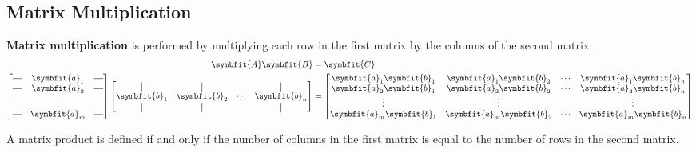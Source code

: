 \documentclass{article}
\begin{document}
\subsection{Matrix Multiplication}
\begin{definition}
    \textbf{Matrix multiplication} is performed by multiplying each row
    in the first matrix by the columns of the second matrix.
    \begin{align*}
        \symbfit{A} \symbfit{B} & = \symbfit{C} \\
        \begin{bmatrix}
            \horzbar & \symbfit{a}_{1} & \horzbar \\
            \horzbar & \symbfit{a}_{2} & \horzbar \\
                     & \vdots          &          \\
            \horzbar & \symbfit{a}_{m} & \horzbar
        \end{bmatrix}
        \begin{bmatrix}
            \vertbar        & \vertbar        &        & \vertbar        \\
            \symbfit{b}_{1} & \symbfit{b}_{2} & \cdots & \symbfit{b}_{n} \\
            \vertbar        & \vertbar        &        & \vertbar
        \end{bmatrix}
                                & =
        \begin{bmatrix}
            \symbfit{a}_1\symbfit{b}_1 & \symbfit{a}_1\symbfit{b}_2 & \cdots & \symbfit{a}_1\symbfit{b}_n \\
            \symbfit{a}_2\symbfit{b}_1 & \symbfit{a}_2\symbfit{b}_2 & \cdots & \symbfit{a}_2\symbfit{b}_n \\
            \vdots                     & \vdots                     &        & \vdots                     \\
            \symbfit{a}_m\symbfit{b}_1 & \symbfit{a}_m\symbfit{b}_2 & \cdots & \symbfit{a}_m\symbfit{b}_n
        \end{bmatrix}
    \end{align*}
\end{definition}
\begin{theorem}
    A matrix product is defined if and only if the number of columns in
    the first matrix is equal to the number of rows in the second
    matrix.
\end{theorem}
\end{document}
